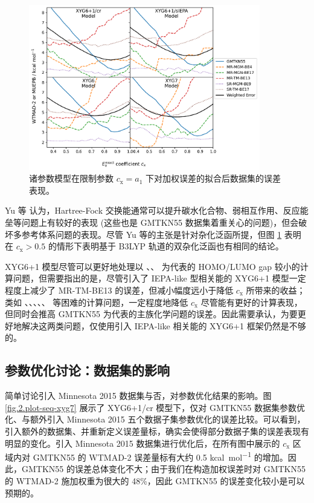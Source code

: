 \begin{figure}[h]
  \centering
  \includegraphics[width=0.9\textwidth]{assets/plot-seq.pdf}
  \caption{诸参数模型在限制参数 $c_\mathrm{x} = a_1$ 下对加权误差的拟合后数据集的误差表现。}
  \label{fig.2.plot-seq}
\end{figure}

Yu 等\cite{Yu-Truhlar.CS.2016} 认为，Hartree-Fock 交换能通常可以提升碳水化合物、弱相互作用、反应能垒等问题上有较好的表现 (这些也是 GMTKN55 数据集着重关心的问题)，但会破坏多参考体系问题的表现。尽管 Yu 等的主张是针对杂化泛函所提，但图 \ref{fig.2.plot-seq} 表明在 $c_\mathrm{x} > 0.5$ 的情形下表明基于 B3LYP 轨道的双杂化泛函也有相同的结论。

XYG6+1 模型尽管可以更好地处理以 、、 为代表的 HOMO/LUMO gap 较小的计算问题，但需要指出的是，尽管引入了 IEPA-like 型相关能的 XYG6+1 模型一定程度上减少了 MR-TM-BE13 的误差，但减小幅度远小于降低 $c_\mathrm{x}$ 所带来的收益；类如 、、、、、 等困难的计算问题，一定程度地降低 $c_\mathrm{x}$ 尽管能有更好的计算表现，但同时会推高 GMTKN55 为代表的主族化学问题的误差。因此需要承认，为要更好地解决这两类问题，仅使用引入 IEPA-like 相关能的 XYG6+1 框架仍然是不够的。

\subsection{参数优化讨论：数据集的影响}
\label{sec.2.propotion-dataset}

简单讨论引入 Minnesota 2015 数据集与否，对参数优化结果的影响。图 \ref{fig.2.plot-seq-xyg7} 展示了 XYG6+1/cr 模型下，仅对 GMTKN55 数据集参数优化、与额外引入 Minnesota 2015 五个数据子集参数优化的误差比较。可以看到，引入额外的数据集、并重新定义误差量标，确实会使得部分数据子集的误差表现有明显的变化。引入 Minnesota 2015 数据集进行优化后，在所有图中展示的 $c_\mathrm{x}$ 区域内对 GMTKN55 的 WTMAD-2 误差量标有大约 0.5 \si{kcal.mol^{-1}} 的增加。因此，GMTKN55 的误差总体变化不大；由于我们在构造加权误差时对 GMTKN55 的 WTMAD-2 施加权重为很大的 48\%，因此 GMTKN55 的误差变化较小是可以预期的。


